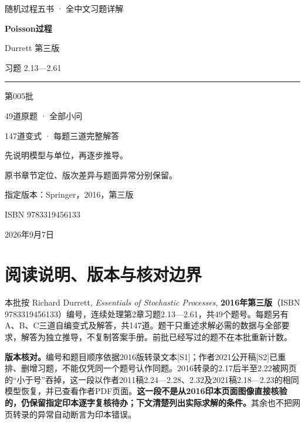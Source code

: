 \documentclass[12pt,a4paper,UTF8,fontset=fandol]{ctexart}
\begin{document}
\begin{titlepage}
\thispagestyle{empty}
\vspace*{13mm}
{\color{slate}\large 随机过程五书 · 全中文习题详解}\par
\vspace{19mm}
{\color{navy}\fontsize{28}{36}\selectfont\bfseries Poisson过程\par}
\vspace{5mm}
{\fontsize{19}{27}\selectfont Durrett 第三版\par 习题 2.13—2.61\par}
\vspace{10mm}
\noindent\textcolor{navy}{\rule{\linewidth}{1.2pt}}\par
\vspace{8mm}
{\Large 第005批\par}
\vspace{5mm}
{\large 49道原题 · 全部小问\par 147道变式 · 每题三道完整解答\par}
\vspace{13mm}
{\normalsize 先说明模型与单位，再逐步推导。\par 原书章节定位、版次差异与题面异常分别保留。\par}
\vfill
{\color{slate}指定版本：Springer，2016，第三版\par ISBN 9783319456133\par 2026年9月7日\par}
\end{titlepage}
\tableofcontents
\clearpage
\section{阅读说明、版本与核对边界}\label{ux9605ux8bfbux8bf4ux660eux7248ux672cux4e0eux6838ux5bf9ux8fb9ux754c}

本批按 Richard Durrett, \emph{Essentials of Stochastic Processes},
\textbf{2016年第三版}（ISBN
9783319456133）编号，连续处理第2章习题2.13---2.61，共49个题号。每题另有A、B、C三道自编变式及解答，共147道。题干只重述求解必需的数据与全部要求，解答为独立推导，不复制答案手册。前批已经写过的题不在本批重新计数。

\textbf{版本核对。}编号和题目顺序依据2016版转录文本{[}S1{]}；作者2021公开稿{[}S2{]}已重排、删增习题，不能仅凭同一个题号认作同题。2016转录的2.17后半至2.22被网页的``小于号''吞掉，这一段以作者2011稿2.24---2.28、2.32及2021稿2.18---2.23的相同模型恢复，并已查看作者PDF页面。\textbf{这一段不是从2016印本页面图像直接核验的，仍保留指定印本逐字复核待办；下文清楚列出实际求解的条件。}其余也不把网页转录的异常自动断言为印本错误。
\end{document}

